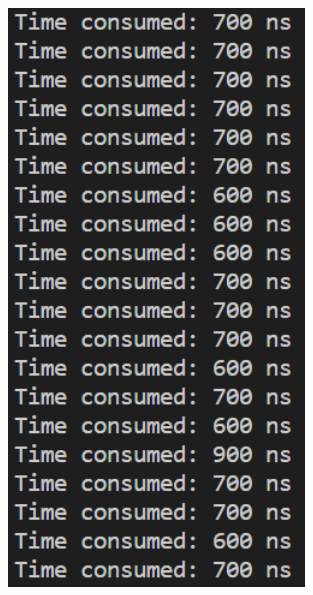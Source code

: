 \documentclass[a4paper,12pt]{article}
\begin{document}
\begin{figure}[H]
{\begin{minipage}[t]{0.4\textwidth}
        \includegraphics[width = 0.7\textwidth]{N = 1600, Asm optimization.png}
    \end{minipage}}
\end{figure}
\end{document}
